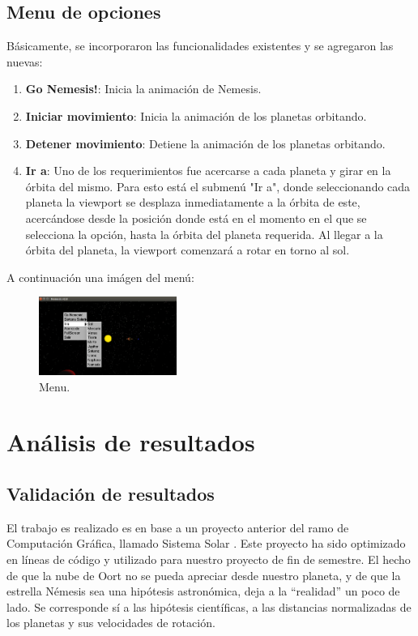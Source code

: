 \documentclass[journal]{IEEEtran}
\begin{document}
\subsection{Menu de opciones}

Básicamente, se incorporaron las funcionalidades existentes y se agregaron las nuevas:

\begin{enumerate}
	\item \textbf{Go Nemesis!}: Inicia la animación de Nemesis.
	\item \textbf{Iniciar movimiento}: Inicia la animación de los planetas orbitando.
	\item \textbf{Detener movimiento}: Detiene la animación de los planetas orbitando.
	\item \textbf{Ir a}: Uno de los requerimientos fue acercarse a cada planeta y girar en la órbita del mismo.  Para esto está el submenú "Ir a", donde seleccionando cada planeta la viewport se desplaza inmediatamente a la órbita de este, acercándose desde la posición donde está en el momento en el que se selecciona la opción, hasta la órbita del planeta requerida. Al llegar a la órbita del planeta, la viewport comenzará a rotar en torno al sol.
\end{enumerate}

A continuación una imágen del menú:

\begin{figure}[h!]
	\includegraphics[width=0.4\textwidth, height=0.25\textwidth]{menu.png}
	\centering
	\caption{Menu.}
\end{figure}


\section{Análisis de resultados}

\subsection{Validación de resultados}

 El trabajo es realizado es en base a un proyecto anterior del ramo de Computación Gráfica, llamado Sistema Solar \cite{anterior}. Este proyecto ha sido optimizado en líneas de código y utilizado para nuestro proyecto de fin de semestre. El hecho de que la nube de Oort no se pueda apreciar desde nuestro planeta, y de que la estrella Némesis sea una hipótesis astronómica, deja a la “realidad” un poco de lado. Se corresponde sí a las hipótesis científicas, a las distancias normalizadas de los planetas y sus velocidades de rotación.
\end{document}
